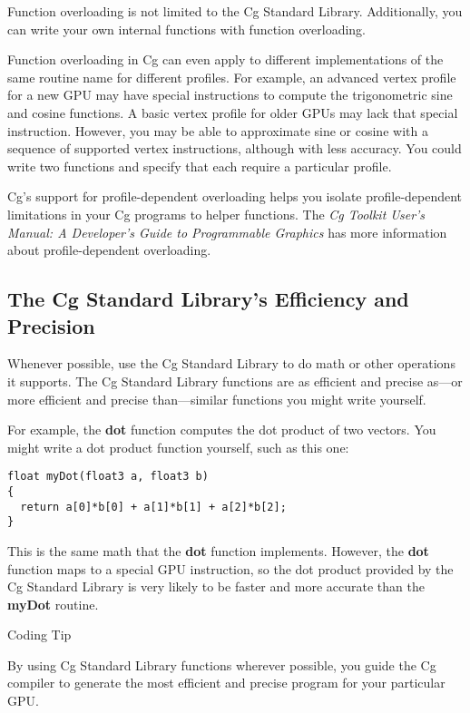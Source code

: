 \documentclass[../main.tex]{subfiles}
\begin{document}
Function overloading is not limited to the Cg Standard Library. Additionally, you can write your own internal functions with function overloading.

Function overloading in Cg can even apply to different implementations of the same routine name for different profiles. For example, an advanced vertex profile for a new GPU may have special instructions to compute the trigonometric sine and cosine functions. A basic vertex profile for older GPUs may lack that special instruction. However, you may be able to approximate sine or cosine with a sequence of supported vertex instructions, although with less accuracy. You could write two functions and specify that each require a particular profile.

Cg's support for profile-dependent overloading helps you isolate profile-dependent limitations in your Cg programs to helper functions. The \textit{Cg Toolkit User's Manual: A Developer's Guide to Programmable Graphics} has more information about profile-dependent overloading.

\subsection*{The Cg Standard Library's Efficiency and Precision}

Whenever possible, use the Cg Standard Library to do math or other operations it supports. The Cg Standard Library functions are as efficient and precise as—or more efficient and precise than—similar functions you might write yourself.

For example, the \textbf{dot} function computes the dot product of two vectors. You might write a dot product function yourself, such as this one:

\FloatBarrier
\begin{lstlisting}
float myDot(float3 a, float3 b)
{
  return a[0]*b[0] + a[1]*b[1] + a[2]*b[2];
}
\end{lstlisting}
\FloatBarrier

This is the same math that the \textbf{dot} function implements. However, the \textbf{dot} function maps to a special GPU instruction, so the dot product provided by the Cg Standard Library is very likely to be faster and more accurate than the \textbf{myDot} routine.

\begin{framed}
Coding Tip

By using Cg Standard Library functions wherever possible, you guide the Cg compiler to generate the most efficient and precise program for your particular GPU.
\end{framed}
\end{document}
